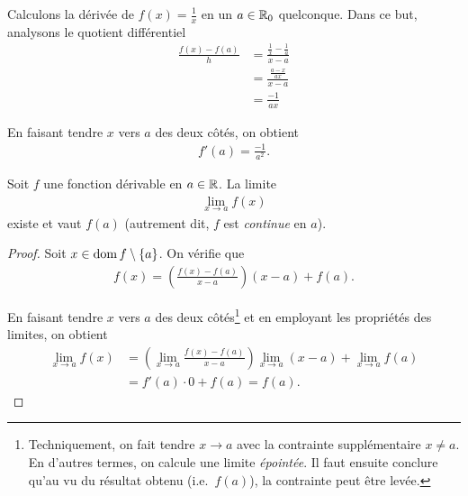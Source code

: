 \documentclass[main.tex]{subfiles}
\begin{document}
\begin{example}

    Calculons la dérivée de $f(x) = \frac 1 x$ en un $a \in \mathbb{R}_0$ quelconque.
    Dans ce but,
    analysons le quotient différentiel
    \begin{align}
        \frac {f(x) - f(a)} h
        &= \frac {\frac 1 x - \frac 1 a}{x - a}\\
        &= \frac{\frac{a - x}{ax}}{x - a}\\
        &= \frac {-1}{ax}
    \end{align}

    En faisant tendre $x$ vers $a$ des deux côtés,
    on obtient
    \begin{align}
        f'(a) = \frac {-1} {a^2}.
    \end{align}
\end{example}

\begin{proposition}

    Soit $f$ une fonction dérivable en $a \in \mathbb{R}$.
    La limite
    \begin{align}
        \lim_{x \to a} f(x)
    \end{align}
    existe et vaut $f(a)$
    (autrement dit, $f$ est \emph{continue} en $a$).
\end{proposition}
\begin{proof}
    Soit $x \in \operatorname{dom} f \setminus \{a\}$.
    On vérifie que
    \begin{align}
        f(x) = \left(\frac {f(x) - f(a)} {x - a}\right) (x - a) + f(a).
    \end{align}

    En faisant tendre $x$ vers $a$ des deux côtés\footnote{%
        Techniquement, on fait tendre $x \to a$ avec la contrainte supplémentaire $x \neq a$.
        En d'autres termes, on calcule une limite \emph{épointée}.
        Il faut ensuite conclure qu'au vu du résultat obtenu (i.e.\ $f(a)$),
        la contrainte peut être levée.
    }
    et en employant les propriétés des limites,
    on obtient
    \begin{align}
        \lim_{x \to a} f(x)
        &= \left(\lim_{x \to a} \frac {f(x) - f(a)} {x - a}\right) \lim_{x \to a} (x - a) + \lim_{x \to a} f(a)\\
        &= f'(a) \cdot 0 + f(a) = f(a).
    \end{align}
\end{proof}
\end{document}
